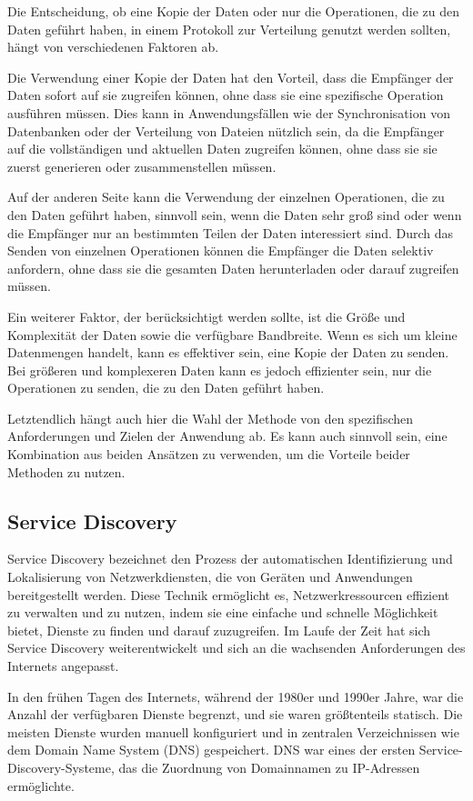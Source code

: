 Die Entscheidung, ob eine Kopie der Daten oder nur die Operationen, die zu den Daten geführt haben, in einem Protokoll zur Verteilung genutzt werden sollten, hängt von verschiedenen Faktoren ab.

Die Verwendung einer Kopie der Daten hat den Vorteil, dass die Empfänger der Daten sofort auf sie zugreifen können, ohne dass sie eine spezifische Operation ausführen müssen. Dies kann in Anwendungsfällen wie der Synchronisation von Datenbanken oder der Verteilung von Dateien nützlich sein, da die Empfänger auf die vollständigen und aktuellen Daten zugreifen können, ohne dass sie sie zuerst generieren oder zusammenstellen müssen.

Auf der anderen Seite kann die Verwendung der einzelnen Operationen, die zu den Daten geführt haben, sinnvoll sein, wenn die Daten sehr groß sind oder wenn die Empfänger nur an bestimmten Teilen der Daten interessiert sind. Durch das Senden von einzelnen Operationen können die Empfänger die Daten selektiv anfordern, ohne dass sie die gesamten Daten herunterladen oder darauf zugreifen müssen.

Ein weiterer Faktor, der berücksichtigt werden sollte, ist die Größe und Komplexität der Daten sowie die verfügbare Bandbreite. Wenn es sich um kleine Datenmengen handelt, kann es effektiver sein, eine Kopie der Daten zu senden. Bei größeren und komplexeren Daten kann es jedoch effizienter sein, nur die Operationen zu senden, die zu den Daten geführt haben.

Letztendlich hängt auch hier die Wahl der Methode von den spezifischen Anforderungen und Zielen der Anwendung ab. Es kann auch sinnvoll sein, eine Kombination aus beiden Ansätzen zu verwenden, um die Vorteile beider Methoden zu nutzen.


\subsection{Service Discovery}

Service Discovery bezeichnet den Prozess der automatischen Identifizierung und Lokalisierung von Netzwerkdiensten, die von Geräten und Anwendungen bereitgestellt werden. Diese Technik ermöglicht es, Netzwerkressourcen effizient zu verwalten und zu nutzen, indem sie eine einfache und schnelle Möglichkeit bietet, Dienste zu finden und darauf zuzugreifen. Im Laufe der Zeit hat sich Service Discovery weiterentwickelt und sich an die wachsenden Anforderungen des Internets angepasst.

In den frühen Tagen des Internets, während der 1980er und 1990er Jahre, war die Anzahl der verfügbaren Dienste begrenzt, und sie waren größtenteils statisch. Die meisten Dienste wurden manuell konfiguriert und in zentralen Verzeichnissen wie dem Domain Name System (DNS) gespeichert. DNS war eines der ersten Service-Discovery-Systeme, das die Zuordnung von Domainnamen zu IP-Adressen ermöglichte.

